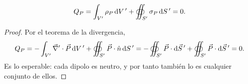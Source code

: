 \begin{proposicion}\label{prop:carga-pol-nula}
\begin{equation}\label{eq:carga-pol-nula}
  Q_{P}=\int_{V'}\rho_{P}\,\mathrm{d} V\,'+\oiint_{S'}\sigma_{P}\,\mathrm{d} S\,'=0 .
\end{equation}
\end{proposicion}
\begin{proof}
Por el teorema de la divergencia,
\[
  Q_{P}=-\int_{V'}\vec{\nabla}'\cdot\vec{P}\,\mathrm{d} V\,'+\oiint_{S'}\vec{P}\cdot\hat{n}\,\mathrm{d} S\,'=-\oiint_{S'}\vec{P}\cdot\mathrm{d}\vec{S}\,'+\oiint_{S'}\vec{P}\cdot\mathrm{d}\vec{S}\,'=0 .
\]
Es lo esperable: cada dipolo es neutro, y por tanto también lo es cualquier conjunto de ellos.
\end{proof}
